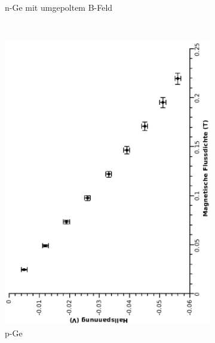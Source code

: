 \documentclass[12pt,a4paper,twopage]{article}
\begin{document}
\begin{figure}
\begin{subfigure}{0.4\textwidth}
\caption{n-Ge mit umgepoltem B-Feld}
\end{subfigure}
\\
\begin{subfigure}{0.4\textwidth}
\includegraphics[width=0.9\linewidth, angle=-90]{ppe.eps}
\caption{p-Ge}
\end{subfigure}
\begin{subfigure}{0.4\textwidth}

\end{subfigure}
\end{figure}
\end{document}
